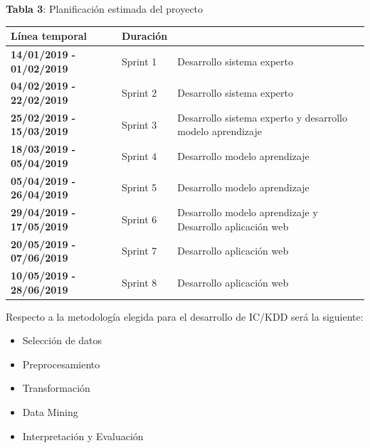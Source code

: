 \documentclass[11pt,a4paper,twoside,final]{article}
\begin{document}
\begin{center}
   \textbf{Tabla 3}: Planificación estimada del proyecto\\[1em]
   \begin{tabular}{p{} p{} p{}}
        \hline
		\textbf{Línea temporal} & \textbf{Duración}  & \text{Temática}\\
		\hline
		    \textbf{14/01/2019 - 01/02/2019} & Sprint 1 & Desarrollo sistema experto\\
		    \textbf{04/02/2019 - 22/02/2019} & Sprint 2 & Desarrollo sistema experto \\
		    \textbf{25/02/2019 - 15/03/2019} & Sprint 3 & Desarrollo sistema experto y desarrollo modelo aprendizaje\\
		    \textbf{18/03/2019 - 05/04/2019} & Sprint 4 & Desarrollo modelo aprendizaje\\
		    \textbf{05/04/2019 - 26/04/2019} & Sprint 5 & Desarrollo modelo aprendizaje\\
		    \textbf{29/04/2019 - 17/05/2019} & Sprint 6 & Desarrollo modelo aprendizaje y Desarrollo aplicación web\\
		    \textbf{20/05/2019 - 07/06/2019} & Sprint 7 & Desarrollo aplicación web\\
		    \textbf{10/05/2019 - 28/06/2019} & Sprint 8 & Desarrollo aplicación web\\
		\hline
   \end{tabular}
\end{center}

Respecto a la metodología elegida para el desarrollo de IC/KDD será la siguiente:
\begin{itemize}
  \setlength\itemsep{1pt}
  \item Selección de datos
  \item Preprocesamiento
  \item Transformación
  \item Data Mining
  \item Interpretación y Evaluación
\end{itemize}

\end{document}
